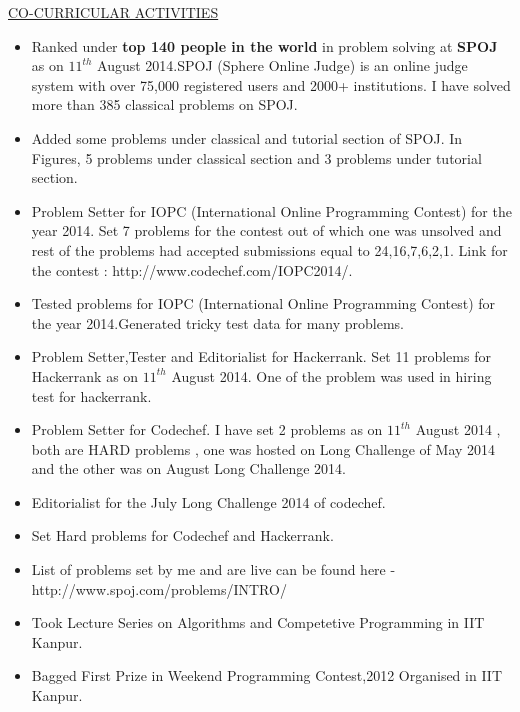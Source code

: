 \documentclass[10pt]{res}
\begin{document}
\begin{resume}
\begin{section}{\underline{CO-CURRICULAR ACTIVITIES}}
\vspace{.2in}
\begin{itemize}
\item{
Ranked under {\bf top 140 people in the world} in problem solving at {\bf SPOJ} as on $11^{th}$ August 2014.SPOJ (Sphere Online Judge) is an online judge system with over 75,000 registered users  and 2000+ institutions. I have solved more than 385 classical problems on SPOJ.
}
\item{
Added some problems under classical and tutorial section of SPOJ. In Figures, 5 problems under classical section and 3 problems under tutorial section.
}
\item{
Problem Setter for IOPC (International Online Programming Contest) for the year 2014. Set 7 problems for the contest out of which one was unsolved and rest of the problems had accepted submissions equal to 24,16,7,6,2,1. Link for the contest : http://www.codechef.com/IOPC2014/.
}
\item{
Tested problems for IOPC (International Online Programming Contest) for the year 2014.Generated tricky test data for many problems.
}
\item{
Problem Setter,Tester and Editorialist for Hackerrank. Set 11 problems for Hackerrank as on $11^{th}$ August 2014. One of the problem was used in hiring test for hackerrank.
}
\item{
Problem Setter for Codechef. I have set 2 problems as on $11^{th}$ August 2014 , both are HARD problems , one was hosted on Long Challenge of May 2014 and the other was on August Long Challenge 2014.
}
\item{
Editorialist for the July Long Challenge 2014 of codechef.
}
\item{
Set Hard problems for Codechef and Hackerrank.
}
\item{
List of problems set by me and are live can be found here - http://www.spoj.com/problems/INTRO/
}
\item{
Took Lecture Series on Algorithms and Competetive Programming in IIT Kanpur.
}
\item{
Bagged First Prize in Weekend Programming Contest,2012 Organised in IIT Kanpur.
}


\end{itemize}
\end{section}
\end{resume}
\end{document}
